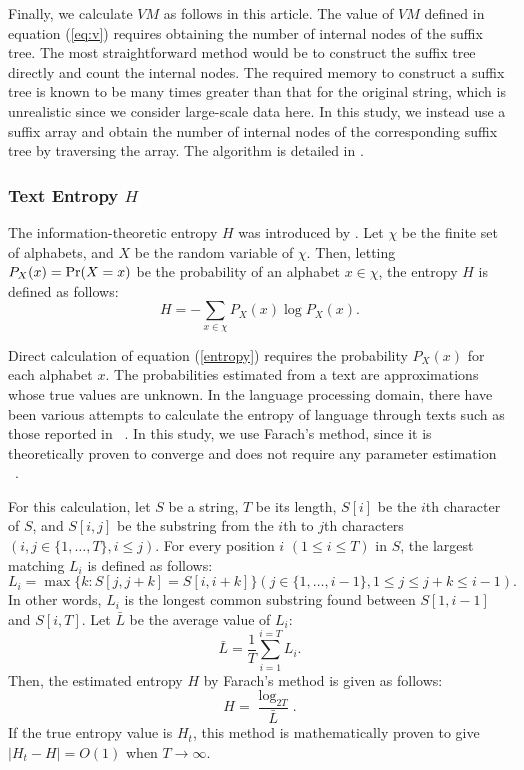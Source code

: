 \documentclass[english]{jnlp_1.4_rep}
\begin{document}
Finally, we calculate $\mathit{VM}$ as follows in this article. The value of $\mathit{VM}$ defined in equation (\ref{eq:v}) requires obtaining the number of internal nodes of the suffix tree. The most straightforward method would be to construct the suffix tree directly and count the internal nodes. The required memory to construct a suffix tree is known to be many times greater than that for the original string, which is unrealistic since we consider large-scale data
 here. In this study, we instead use a suffix array and obtain the number of internal nodes of the corresponding suffix tree by traversing the array. The algorithm is detailed in \cite{Kasai01}.


\subsubsection*{Text Entropy $H$}

The information-theoretic entropy $H$ was introduced by \cite{Shannon}. Let $\chi$ be the finite set of alphabets, and $X$ be the random variable of $\chi$. Then, letting $P_X(x)={\rm Pr}( X=x )$ be the probability of an alphabet $x\in \chi$, the entropy $H$ is defined as follows:
\begin{equation}
H = -\sum_{x \in \chi}P_X(x) \log P_X(x). \label {entropy}
\end{equation}

Direct calculation of equation (\ref{entropy}) requires the probability $P_X(x)$ for each alphabet $x$. The probabilities estimated from a text are approximations whose true values are unknown. In the language processing domain, there have been various attempts to 
calculate the entropy of language through texts such as those reported in ~\cite{cover,brown}. In this study, we use Farach's method, since it is theoretically proven to converge and does not require any parameter estimation ~\cite{Farach}. 

For this calculation, let $S$ be a string, $T$ be its length, $S[i]$ be the $i$th character of $S$, and $S[i,j]$ be the substring from the $i$th to $j$th characters $(i,j\in\{1,\ldots,T\}, i \leq j)$. For every position $i$ $(1 \leq i \leq T)$ in $S$, the largest matching $L_i$ is defined as follows:
\begin{equation}
L_i= \max \{k: S[j, j+k]=S[i, i+k]\}  (j\in\{1,\ldots,i-1\}, 1 \leq j \leq j+k \leq i-1).\label{eq L}
\end{equation}
In other words, $L_i$ is the longest common substring found between $S[1,i-1]$ and $S[i,T]$. Let $\bar{L}$ be the average value of $L_i$: 
\begin{equation}
\bar{L}=\frac{1}{T}\sum_{i=1}^{i=T}L_i. 
\end{equation}
Then, the estimated entropy $H$ by Farach's method is given as follows:
\begin{equation}
H=\frac{\log_{2T}}{\bar{L}}.
\end{equation}   
If the true entropy value is $H_t$, this method is mathematically proven to give $|H_t-H|=O(1)$ when $T\to\infty$.
\end{document}
